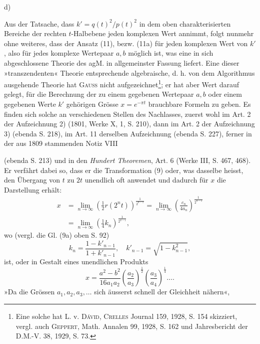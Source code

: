 \par\medskip
\begin{center}d) \end{center}
\noindent\hspace*{\parindent}Aus der Tatsache, dass \(k'=q(t)^2/p(t)^2\) in dem oben charakterisierten Bereiche
der rechten \(t\)-Halbebene jeden komplexen Wert annimmt, folgt nunmehr
ohne weiteres, dass der Ansatz (11), bezw. (11a) für jeden komplexen
Wert von \(k'\), also für jedes komplexe Wertepaar \(a,b\) möglich ist, was eine
in sich abgeschlossene Theorie des agM. in allgemeinster Fassung liefert. Eine
dieser »transzendenten« Theorie entsprechende algebraische, d. h. von dem Algorithmus
ausgehende Theorie hat \textsc{Gauss} nicht aufgezeichnet\footnote{Eine solche hat L. v. \textsc{Dávid}, \textsc{Crelles} Journal 159, 1928, S. 154 skizziert, vergl. auch \textsc{Geppert}, Math. Annalen 99, 1928, S. 162 und Jahresbericht der D.M.-V. 38, 1929, S. 73.}; er hat aber
Wert darauf gelegt, für die Berechnung der zu einem gegebenen Wertepaar
\(a,b\) oder einem gegebenen Werte \(k'\) gehörigen Grösse \(x=e^{-\pi t}\) brauchbare
Formeln zu geben. Es finden sich solche an verschiedenen Stellen des Nachlasses,
zuerst wohl im Art. 2 der Aufzeichnung 2) (1801, Werke X, 1, S. 210),
dann im Art. 2 der Aufzeichnung 3) (ebenda S. 218), im Art. 11 derselben
Aufzeichnung (ebenda S. 227), ferner in der aus 1809 stammenden Notiz VIII\par
\clearpage{}
\HistoricalFoot{}{14\textsuperscript{*}}
\noindent (ebenda S. 213) und in den \textit{Hundert Theoremen}, Art. 6 (Werke III, S. 467,
468). Er verfährt dabei so, dass er die Transformation (9) oder, was dasselbe
heisst, den Übergang von \(t\) zu \(2t\) unendlich oft anwendet und dadurch für \(x\)
die Darstellung erhält:
\[
\begin{aligned}
x&=\lim_{n\to\infty}\left(\tfrac12r(2^nt)\right)^{\frac1{2^{n-1}}}
=\lim_{n\to\infty}\left(\frac{c_n}{4a_n}\right)^{\frac1{2^{n-1}}}\\
&=\lim_{n\to\infty}(\tfrac14k_n)^{\frac1{2^{n-1}}},
\end{aligned}
\]
\noindent wo (vergl. die Gl. (9a) oben S. 92)
\[
k_n=\frac{1-k'_{n-1}}{1+k'_{n-1}},\quad k'_{n-1}=\sqrt{1-k_{n-1}^2},
\]
\noindent ist, oder in Gestalt eines unendlichen Produkts
\[
x=\frac{a^2-b^2}{16a_1a_2}\left(\frac{a_2}{a_3}\right)^{\frac12}\left(\frac{a_3}{a_4}\right)^{\frac14}\ldots.
\]
\noindent »Da die Grössen \(a_1,a_2,a_3,\ldots\) sich äusserst schnell der Gleichheit nähern«,
